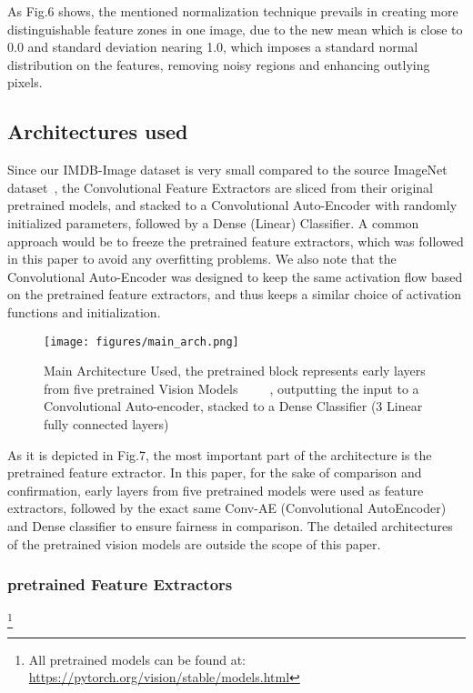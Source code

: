 \documentclass[conference]{IEEEtran}
\begin{document}
                As Fig.6 shows, the mentioned normalization technique prevails in creating more distinguishable feature zones
                in one image, due to the new mean which is close to 0.0 and standard deviation nearing 1.0, which imposes a standard normal distribution on the features, removing noisy regions and enhancing outlying pixels.
                
                
\subsection{Architectures used}

                Since our IMDB-Image dataset is very small compared to the source 
				ImageNet dataset~\cite{imagenet}, the Convolutional Feature Extractors are sliced from their original pretrained models, and stacked to a Convolutional Auto-Encoder with randomly initialized parameters, followed by a Dense (Linear) Classifier. A common approach would be to freeze the pretrained feature extractors, which was followed in this paper to avoid any overfitting problems. We also note that the Convolutional Auto-Encoder was designed to keep the same activation flow based on the pretrained feature extractors, and thus keeps a similar choice of activation functions and initialization.
                
                \begin{figure}[htbp]
                \centerline{\texttt{[image: figures/main\_arch.png]}}
                \caption{Main Architecture Used, the pretrained block represents early layers from five pretrained Vision Models~\cite{alexnet}~\cite{shufflenetv2}~\cite{vgg16}~\cite{resnet}~\cite{resnext}, outputting the input to a Convolutional Auto-encoder, stacked to a Dense Classifier (3 Linear fully connected layers)}
                \label{figure-5}
                \end{figure}
                
				As it is depicted in Fig.7, the most important part of the 
				architecture is the pretrained feature extractor. In this paper, for 
				the sake of comparison and confirmation, early layers from five 
				pretrained models were used as feature extractors, followed by the 
				exact same Conv-AE (Convolutional AutoEncoder) and Dense classifier to ensure fairness in comparison.
				The detailed architectures of the pretrained vision models are outside the scope of this paper.
		
\subsubsection{pretrained Feature Extractors}\footnote{All pretrained models can be found at: \url{https://pytorch.org/vision/stable/models.html}}
\end{document}
